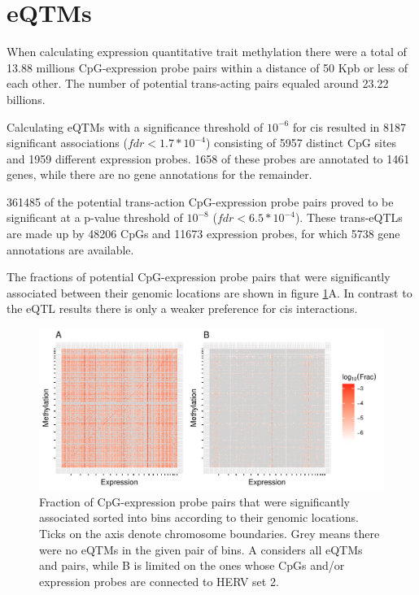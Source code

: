 \documentclass[a4paper,12pt,twoside,openright]{report}
\begin{document}
\section{eQTMs}
\label{Results:eQTMs}
When calculating expression quantitative trait methylation there were a total of 13.88 millions CpG-expression probe pairs within a distance of 50 Kpb or less of each other. The number of potential trans-acting pairs equaled around 23.22 billions. 

Calculating eQTMs with a significance threshold of $10^{-6}$ for cis resulted in 8187 significant associations ($fdr<1.7*10^{-4}$) consisting of 5957 distinct CpG sites and 1959 different expression probes. 1658 of these probes are annotated to 1461 genes, while there are no gene annotations for the remainder. 

361485 of the potential trans-action CpG-expression probe pairs proved to be significant at a p-value threshold of $10^{-8}$ ($fdr<6.5*10^{-4}$). These trans-eQTLs are made up by 48206 CpGs and 11673 expression probes, for which 5738 gene annotations are available. 

The fractions of potential CpG-expression probe pairs that were significantly associated between their genomic locations are shown in figure \ref{fig:global.eqtm.heatmap}A. In contrast to the eQTL results there is only a weaker preference for cis interactions. 

\begin{figure}[tb]
	\includegraphics[scale = 1, keepaspectratio = true]{../figures/eqtm_all_herv_heatmap}  
	\caption{Fraction of CpG-expression probe pairs that were significantly associated sorted into bins according to their genomic locations. Ticks on the axis denote chromosome boundaries. Grey means there were no eQTMs in the given pair of bins. A considers all eQTMs and pairs, while B is limited on the ones whose CpGs and/or expression probes are connected to HERV set 2.}
    \label{fig:global.eqtm.heatmap}
\end{figure}
\end{document}
